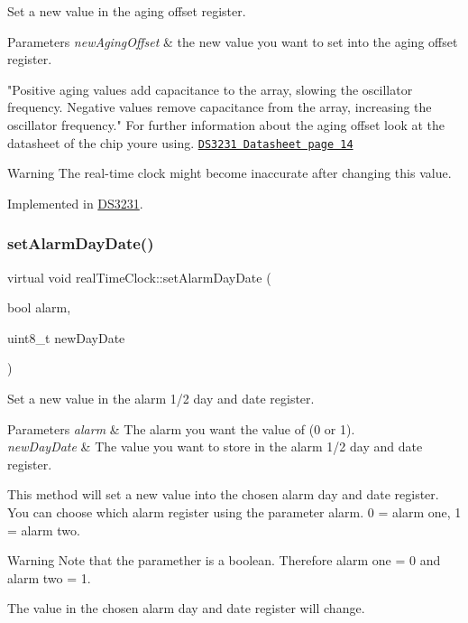 Set a new value in the aging offset register. 


\begin{DoxyParams}{Parameters}
{\em new\+Aging\+Offset} & the new value you want to set into the aging offset register.\\
\hline
\end{DoxyParams}
"Positive aging values add capacitance to the array, slowing the oscillator frequency. Negative values remove capacitance from the array, increasing the oscillator frequency." For further information about the aging offset look at the datasheet of the chip you\textquotesingle{}re using. \href{https://datasheets.maximintegrated.com/en/ds/DS3231.pdf}{\tt D\+S3231 Datasheet page 14} \begin{DoxyWarning}{Warning}
The real-\/time clock might become inaccurate after changing this value. 
\end{DoxyWarning}


Implemented in \mbox{\hyperlink{class_d_s3231_a0a9dc2668139654b261c2feeb1d6e663}{D\+S3231}}.

\mbox{\label{classreal_time_clock_a2c2bb16a7fc59f463fb3aaed2fcd1926}} 
\subsubsection{\texorpdfstring{set\+Alarm\+Day\+Date()}{setAlarmDayDate()}}
{\footnotesize\ttfamily virtual void real\+Time\+Clock\+::set\+Alarm\+Day\+Date (\begin{DoxyParamCaption}\item[{bool}]{alarm,  }\item[{uint8\+\_\+t}]{new\+Day\+Date }\end{DoxyParamCaption})\hspace{0.3cm}{\ttfamily [pure virtual]}}



Set a new value in the alarm 1/2 day and date register. 


\begin{DoxyParams}{Parameters}
{\em alarm} & The alarm you want the value of (0 or 1). \\
\hline
{\em new\+Day\+Date} & The value you want to store in the alarm 1/2 day and date register.\\
\hline
\end{DoxyParams}
This method will set a new value into the chosen alarm day and date register. You can choose which alarm register using the parameter alarm. 0 = alarm one, 1 = alarm two. \begin{DoxyWarning}{Warning}
Note that the paramether is a boolean. Therefore alarm one = 0 and alarm two = 1. 

The value in the chosen alarm day and date register will change. 
\end{DoxyWarning}


